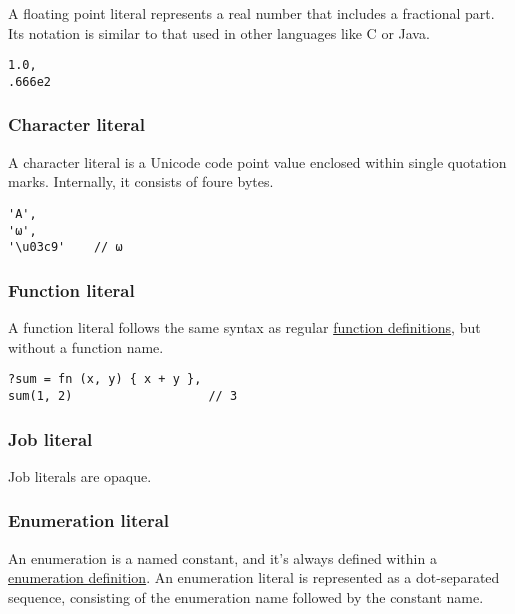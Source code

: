 A floating point literal represents a real number that includes a
fractional part. Its notation is similar to that used in other languages
like C or Java.

\begin{verbatim}
1.0,
.666e2
\end{verbatim}

\hypertarget{character-literal}{%
\subsubsection{Character literal}\label{character-literal}}

A character literal is a Unicode code point value enclosed within single
quotation marks. Internally, it consists of foure bytes.

\begin{verbatim}
'A',
'ω',
'\u03c9'    // ω
\end{verbatim}

\hypertarget{function-literal}{%
\subsubsection{Function literal}\label{function-literal}}

A function literal follows the same syntax as regular
\href{function}{function definitions}, but without a function name.

\begin{verbatim}
?sum = fn (x, y) { x + y },
sum(1, 2)                   // 3
\end{verbatim}

\hypertarget{job-literal}{%
\subsubsection{Job literal}\label{job-literal}}

Job literals are opaque.

\hypertarget{enumeration-literal}{%
\subsubsection{Enumeration literal}\label{enumeration-literal}}

An enumeration is a named constant, and it's always defined within a
\href{enumeration}{enumeration definition}. An enumeration literal is
represented as a dot-separated sequence, consisting of the enumeration
name followed by the constant name.

